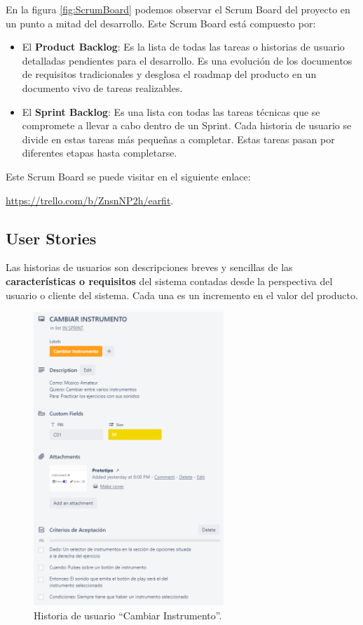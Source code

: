 \documentclass[12pt,twoside,titlepage]{report}
\begin{document}
En la figura \ref{fig:ScrumBoard} podemos observar el Scrum Board del proyecto en un punto a mitad del desarrollo. Este Scrum Board está compuesto por:
\begin{itemize}
    \item El \textbf{Product Backlog}: Es la lista de todas las tareas o historias de usuario detalladas pendientes para el desarrollo. Es una evolución de los documentos de requisitos tradicionales y desglosa el roadmap del producto en un documento vivo de tareas realizables.
    \item El \textbf{Sprint Backlog}: Es una lista con todas las tareas técnicas que se compromete a llevar a cabo dentro de un Sprint. Cada historia de usuario se divide en estas tareas más pequeñas a completar. Estas tareas pasan por diferentes etapas hasta completarse.
\end{itemize}

Este Scrum Board se puede visitar en el siguiente enlace: 

\url{https://trello.com/b/ZnsnNP2h/earfit}.

\subsection{User Stories}

Las historias de usuarios son descripciones breves y sencillas de las \textbf{características o requisitos} del sistema contadas desde la perspectiva del usuario o cliente del sistema. Cada una es un incremento en el valor del producto.
\cite{userstories1}
\cite{userstories2}

\begin{figure}[H]
    \centering
    \includegraphics[width=0.64\textwidth]{Scrum/UserStory}
    \caption{Historia de usuario ``Cambiar Instrumento''.}
    \label{fig:UserStory}
\end{figure}
\end{document}
